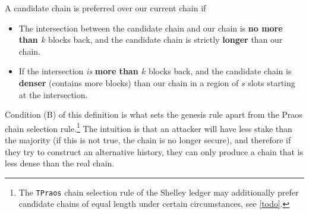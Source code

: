 \begin{definition}
\label{genesis:originalrule}
A candidate chain is preferred over our current chain if

\begin{itemize}
\item The intersection between the candidate chain and our chain is \textbf{no
more than $k$} blocks back, and the candidate chain is strictly \textbf{longer}
than our chain.

\item If the intersection \emph{is} \textbf{more than $k$} blocks back, and the
candidate chain is \textbf{denser} (contains more blocks) than our chain in
a region of $s$ slots starting at the intersection.
\end{itemize}
\end{definition}

Condition (B) of this definition is what sets the genesis rule apart from the
Praos chain selection rule.\footnote{The \lstinline!TPraos! chain selection rule
of the Shelley ledger may additionally prefer candidate chains of equal length
under certain circumstances, see \cref{todo}.} The intuition is that an attacker
will have less stake than the majority (if this is not true, the chain is no
longer secure), and therefore if they try to construct an alternative history,
they can only produce a chain that is less dense than the real chain.


